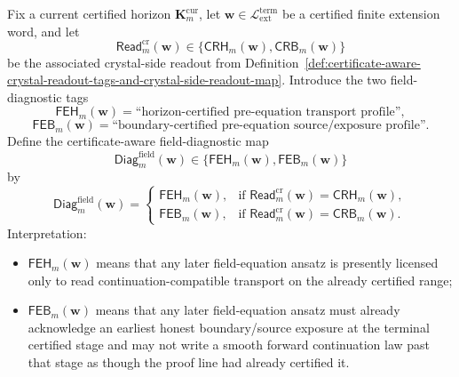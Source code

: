\begin{definition}
\label{def:certificate-aware-field-diagnostic-tags-and-pre-equation-map}
Fix a current certified horizon \(\mathbf K_m^{\mathrm{cur}}\), let \(\mathbf w\in \mathcal L_{\mathrm{ext}}^{\mathrm{term}}\) be a certified finite extension word, and let
\[
 \mathsf{Read}^{\mathrm{cr}}_{m}(\mathbf w)
 \in
 \{\mathsf{CRH}_{m}(\mathbf w),\mathsf{CRB}_{m}(\mathbf w)\}
\]
be the associated crystal-side readout from Definition~\ref{def:certificate-aware-crystal-readout-tags-and-crystal-side-readout-map}. Introduce the two field-diagnostic tags
\[
 \mathsf{FEH}_{m}(\mathbf w)=\text{``horizon-certified pre-equation transport profile''},
\]
\[
 \mathsf{FEB}_{m}(\mathbf w)=\text{``boundary-certified pre-equation source/exposure profile''}.
\]
Define the certificate-aware field-diagnostic map
\[
 \mathsf{Diag}^{\mathrm{field}}_{m}(\mathbf w)
 \in
 \{\mathsf{FEH}_{m}(\mathbf w),\mathsf{FEB}_{m}(\mathbf w)\}
\]
by
\[
 \mathsf{Diag}^{\mathrm{field}}_{m}(\mathbf w)
 =
 \begin{cases}
 \mathsf{FEH}_{m}(\mathbf w), & \text{if }\mathsf{Read}^{\mathrm{cr}}_{m}(\mathbf w)=\mathsf{CRH}_{m}(\mathbf w),\\[2mm]
 \mathsf{FEB}_{m}(\mathbf w), & \text{if }\mathsf{Read}^{\mathrm{cr}}_{m}(\mathbf w)=\mathsf{CRB}_{m}(\mathbf w).
 \end{cases}
\]
Interpretation:
\begin{itemize}[leftmargin=2em]
 \item \(\mathsf{FEH}_{m}(\mathbf w)\) means that any later field-equation ansatz is presently licensed only to read continuation-compatible transport on the already certified range;
 \item \(\mathsf{FEB}_{m}(\mathbf w)\) means that any later field-equation ansatz must already acknowledge an earliest honest boundary/source exposure at the terminal certified stage and may not write a smooth forward continuation law past that stage as though the proof line had already certified it.
\end{itemize}
\end{definition}

